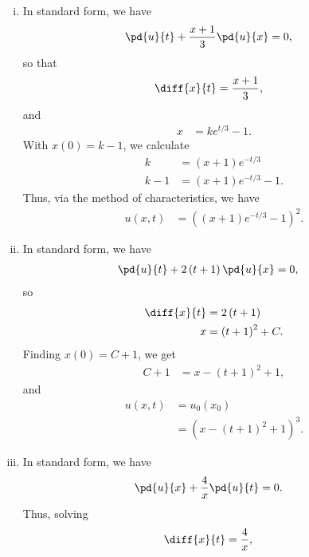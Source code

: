 \documentclass[10pt]{mypackage}
\begin{document}
\begin{solution}\hfill
  \begin{enumerate}[(i)]
    \item In standard form, we have
      \begin{align*}
        \pd{u}{t} + \frac{x+1}{3}\pd{u}{x} &= 0,
      \end{align*}
      so that
      \begin{align*}
        \diff{x}{t} &= \frac{x+1}{3},
      \end{align*}
      and
      \begin{align*}
        x &= ke^{t/3} - 1.
      \end{align*}
      With $x(0) = k-1$, we calculate
      \begin{align*}
        k &= \left( x+1 \right)e^{-t/3}\\
        k-1 &= \left( x+1 \right)e^{-t/3} -1.
      \end{align*}
      Thus, via the method of characteristics, we have
      \begin{align*}
        u\left( x,t \right) &= \left( \left( x+1 \right)e^{-t/3} - 1 \right)^2.
      \end{align*}
    \item In standard form, we have
      \begin{align*}
        \pd{u}{t} + 2\left( t+1 \right)\pd{u}{x} &= 0,
      \end{align*}
      so
      \begin{align*}
        \diff{x}{t} &= 2\left( t+1 \right)\\
        x &= \left( t+1 \right)^2 + C.
      \end{align*}
      Finding $x(0) = C + 1$, we get
      \begin{align*}
        C+1 &= x-\left( t+1 \right)^2 + 1,
      \end{align*}
      and
      \begin{align*}
        u\left( x,t \right) &= u_0\left( x_0 \right)\\
                            &= \left( x-\left( t+1 \right)^2 + 1 \right)^3.
      \end{align*}
    \item In standard form, we have
      \begin{align*}
        \pd{u}{x} + \frac{4}{x}\pd{u}{t} &= 0.
      \end{align*}
      Thus, solving
      \begin{align*}
        \diff{x}{t} &= \frac{4}{x},

\end{align*}
\end{enumerate}
\end{solution}
\end{document}
